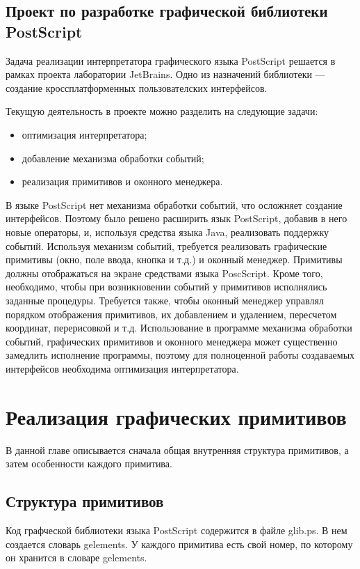 \documentclass[14pt]{extarticle}
\begin{document}
	\subsection{ Проект по разработке графической библиотеки PostScript }
Задача реализации интерпретатора графического языка PostScript решается в рамках проекта лаборатории JetBrains. Одно из назначений библиотеки --- создание кроссплатформенных пользователских интерфейсов.
		
		Текущую деятельность в проекте можно разделить на следующие задачи:
		\begin{itemize}
		\item оптимизация интерпретатора;
		\item добавление механизма обработки событий;
		\item реализация примитивов и оконного менеджера.
		\end{itemize}	
	
	В языке PostScript нет механизма обработки событий, что осложняет создание интерфейсов. Поэтому было решено расширить язык PostScript, добавив в него новые операторы, и, используя средства языка Java, реализовать поддержку событий. Используя механизм событий, требуется реализовать графические примитивы (окно, поле ввода, кнопка и т.д.) и оконный менеджер. Примитивы должны отображаться на экране средствами языка PoscScript. Кроме того, необходимо, чтобы при возникновении событий у примитивов исполнялись заданные процедуры. Требуется также, чтобы оконный менеджер управлял порядком отображения примитивов, их добавлением и удалением, пересчетом координат, перерисовкой и т.д. Использование в программе механизма обработки событий, графических примитивов и оконного менеджера может существенно замедлить исполнение программы, поэтому для полноценной работы создаваемых интерфейсов необходима оптимизация интерпретатора.
	\pagebreak
	\section{Реализация графических примитивов}
	В данной главе описывается сначала общая внутренняя структура примитивов, а затем особенности каждого примитива.
	\subsection{Структура примитивов}
		Код графческой библиотеки языка PostScript содержится в файле  glib.ps. В нем создается словарь gelements. У каждого примитива есть свой номер, по которому он хранится в словаре gelements. 
		
\end{document}
